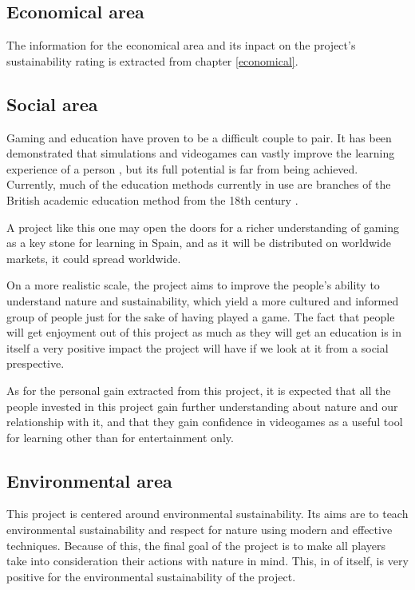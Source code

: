 \subsection{Economical area}

The information for the economical area and its inpact on the project's sustainability rating is extracted from chapter \ref{economical}.

\subsection{Social area}

Gaming and education have proven to be a difficult couple to pair. It has been demonstrated that simulations and videogames can vastly improve the learning experience of a person
, but its full potential is far from being achieved. Currently, much of the education methods currently in use are branches of the British academic education method from the 18th century
.

A project like this one may open the doors for a richer understanding of gaming as a key stone for learning in Spain, and as it will be distributed on worldwide markets, it could spread worldwide.

On a more realistic scale, the project aims to improve the people's ability to understand nature and sustainability, which yield a more cultured and informed group of people just for the sake of having played a game. The fact that people will get enjoyment out of this project as much as they will get an education is in itself a very positive impact the project will have if we look at it from a social prespective. 

As for the personal gain extracted from this project, it is expected that
all the people invested in this project gain further understanding about
nature and our relationship with it, and that they gain confidence in 
videogames as a useful tool for learning other than for entertainment only.

\subsection{Environmental area}

This project is centered around environmental sustainability. Its aims are to teach environmental sustainability and respect for nature using modern and effective techniques. Because of this, the final goal of the project is to make all players take into consideration their actions with nature in mind. This, in of itself, is very positive for the environmental sustainability of the project. 

